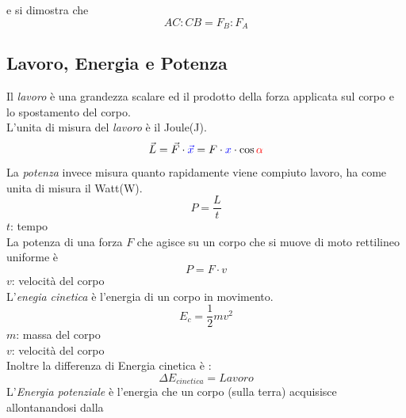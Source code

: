 e si dimostra che 
\begin{equation*}
  AC:CB=F_B:F_A
\end{equation*}


\subsection{Lavoro, Energia e Potenza}\label{subsec:dinamica:potenziale}
Il \emph{lavoro} è una grandezza scalare ed il prodotto della forza applicata sul corpo e lo 
spostamento del corpo.\\L'unita di misura del \emph {lavoro} è il Joule(J).
\begin{equation*}
  \vec{L} = \vec{F} \cdot \mathcolor{blue}{\vec{x}}
  = F\cdot \textcolor{blue}{x} \cdot \cos\mathcolor{red}{\alpha}
\end{equation*}
\begin{center}
\end{center}
La \emph {potenza} invece misura quanto rapidamente viene compiuto lavoro, ha come unita di misura 
il Watt(W).
\begin{equation*}
  P = \frac{L}{t}
\end{equation*}
$t$: tempo \\ [\baselineskip]
La potenza di una forza $F$ che agisce su un corpo che si muove di moto rettilineo uniforme è
\begin{equation*}
  P=F\cdot v
\end{equation*}
$v$: velocità del corpo\\ [\baselineskip]
L'\emph{enegia cinetica} è l'energia di un corpo in movimento.\\
\begin{equation*}
  E_c = \frac{1}{2}mv^2
\end{equation*}
$m$: massa del corpo\\
$v$: velocità del corpo\\ [\baselineskip]
Inoltre la differenza di Energia cinetica è :
\begin{equation*}
  \Delta E_{cinetica}=Lavoro
\end{equation*}
L'\emph{Energia potenziale} è l'energia che un corpo (sulla terra) acquisisce allontanandosi dalla
